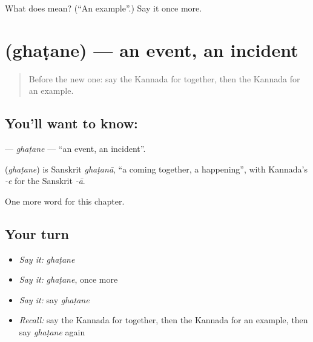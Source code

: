 \begin{tcolorbox}[breakable,colback=teal!4,colframe=teal!35!black,title={Before you move on}]
What does  mean? (\textquotedblleft{}An example\textquotedblright{}.) Say it once more.
\end{tcolorbox}
\section[\texorpdfstring{\kn{ಘಟನೆ} (ghaṭane)}{ಘಟನೆ (ghaṭane)}]{ (ghaṭane) — an event, an incident}

\label{lesson:KA-C253-ghatane}



\begin{quote}
Before the new one: say the Kannada for together, then the Kannada for an example.
\end{quote}

\subsection*{You'll want to know: }
\textbf{} — \emph{ghaṭane} — \textquotedblleft{}an event, an incident\textquotedblright{}.

\begin{cousinweb}
\textbf{} (\emph{ghaṭane}) is Sanskrit \emph{ghaṭanā}, \textquotedblleft{}a coming together, a happening\textquotedblright{}, with Kannada's \emph{-e} for the Sanskrit \emph{-ā}.
\end{cousinweb}

\begin{grammarlens}[title={What you've built}]
One more word for this chapter.
\end{grammarlens}

\subsection*{Your turn}
\begin{itemize}
\raggedright
  \item \emph{Say it:} \emph{ghaṭane}
  \item \emph{Say it:} \emph{ghaṭane}, once more
  \item \emph{Say it:} say \emph{ghaṭane}
  \item \emph{Recall:} say the Kannada for together, then the Kannada for an example, then say \emph{ghaṭane} again
\end{itemize}

